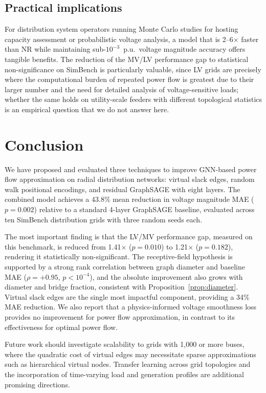 \documentclass[preprint,review,12pt]{elsarticle}
\begin{document}
\subsection{Practical implications}

For distribution system operators running Monte Carlo studies for hosting capacity assessment or probabilistic voltage analysis, a model that is 2--6$\times$ faster than NR while maintaining sub-$10^{-3}$~p.u.\ voltage magnitude accuracy offers tangible benefits. The reduction of the MV/LV performance gap to statistical non-significance on SimBench is particularly valuable, since LV grids are precisely where the computational burden of repeated power flow is greatest due to their larger number and the need for detailed analysis of voltage-sensitive loads; whether the same holds on utility-scale feeders with different topological statistics is an empirical question that we do not answer here.

\section{Conclusion}
\label{sec:conclusion}

We have proposed and evaluated three techniques to improve GNN-based power flow approximation on radial distribution networks: virtual slack edges, random walk positional encodings, and residual GraphSAGE with eight layers. The combined model achieves a 43.8\% mean reduction in voltage magnitude MAE ($p = 0.002$) relative to a standard 4-layer GraphSAGE baseline, evaluated across ten SimBench distribution grids with three random seeds each.

The most important finding is that the LV/MV performance gap, measured on this benchmark, is reduced from 1.41$\times$ ($p = 0.010$) to 1.21$\times$ ($p = 0.182$), rendering it statistically non-significant. The receptive-field hypothesis is supported by a strong rank correlation between graph diameter and baseline MAE ($\rho = +0.95$, $p < 10^{-4}$), and the absolute improvement also grows with diameter and bridge fraction, consistent with Proposition~\ref{prop:diameter}. Virtual slack edges are the single most impactful component, providing a 34\% MAE reduction. We also report that a physics-informed voltage smoothness loss provides no improvement for power flow approximation, in contrast to its effectiveness for optimal power flow.

Future work should investigate scalability to grids with 1,000 or more buses, where the quadratic cost of virtual edges may necessitate sparse approximations such as hierarchical virtual nodes. Transfer learning across grid topologies and the incorporation of time-varying load and generation profiles are additional promising directions.
\end{document}
